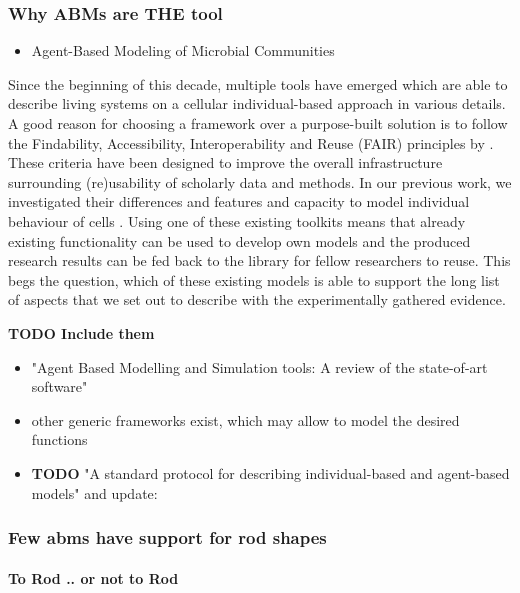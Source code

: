 \subsubsection{Why ABMs are THE tool}
\begin{itemize}
    \item \cite{Nagarajan2022} Agent-Based Modeling of Microbial Communities 
\end{itemize}

Since the beginning of this decade, multiple tools have emerged which are able to describe living
systems on a cellular individual-based approach in various details.
A good reason for choosing a framework over a purpose-built solution is to follow the Findability,
Accessibility, Interoperability and Reuse (FAIR) principles by \cite{Wilkinson2016}.
These criteria have been designed to improve the overall infrastructure surrounding (re)usability of
scholarly data and methods.
In our previous work, we investigated their differences and features and capacity to model
individual behaviour of cells \cite{Pleyer2023}.
Using one of these existing toolkits means that already existing functionality can be used to
develop own models and the produced research results can be fed back to the library for fellow
researchers to reuse.
This begs the question, which of these existing models is able to support the long list of aspects
that we set out to describe with the experimentally gathered evidence.

\textbf{TODO Include them}
\begin{itemize}
    \item \cite{Abar2017} "Agent Based Modelling and Simulation tools: A review of the
        state-of-art software"
    \item other generic frameworks exist, which may allow to model the desired functions
    \item \cite{Grimm2006,Grimm2010} \textbf{TODO} "A standard protocol for describing
        individual-based and
        agent-based models" and update: \cite{Jang2012}
\end{itemize}

\subsubsection{Few \acp{abm} have support for rod shapes}
\paragraph{To Rod .. or not to Rod}

